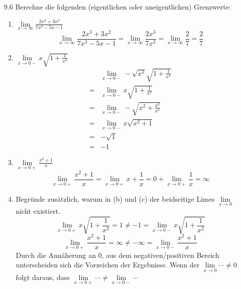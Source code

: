 \documentclass{HM}
\begin{document}
\begin{enumerate}
\item[9.6] Berechne die folgenden (eigentlichen oder uneigentlichen) Grenzwerte:
\begin{enumerate}
	\item $\lim\limits_{x\to\infty} \frac{2x^3+3x^2}{7x^3-5x-1}$
	$$\lim\limits_{x\to\infty} \frac{2x^3+3x^2}{7x^3-5x-1}=\lim\limits_{x\to\infty} \frac{2x^3}{7x^3}=\lim\limits_{x\to\infty} \frac{2}{7}=\frac{2}{7}$$
	\item $\lim\limits_{x\to0-} x\sqrt{1+\frac{1}{x^2}}$
	\begin{align*}
		&\lim\limits_{x\to0-} -\sqrt{x^2}\sqrt{1+\frac{1}{x^2}}\\
		=&\lim\limits_{x\to0-} x\sqrt{1+\frac{1}{x^2}}\\
		=&\lim\limits_{x\to0-} -\sqrt{x^2+\frac{x^2}{x^2}}\\
		=&\lim\limits_{x\to0-} x\sqrt{x^2+1}\\
		=& -\sqrt{1}\\
		=& -1
	\end{align*}
	\item $\lim\limits_{x\to0+}\frac{x^2+1}{x}$
	$$\lim\limits_{x\to0+}\frac{x^2+1}{x}
	=\lim\limits_{x\to0+}x+\frac{1}{x}
	=0+\lim\limits_{x\to0+}\frac{1}{x}
	=\infty$$
	
	\item Begründe zusätzlich, warum in (b) und (c) der beidseitige Limes $\lim\limits_{x\to0}$ nicht existiert.
	$$\lim\limits_{x\to0+}x\sqrt{1+\frac{1}{x^2}} = 1\not= -1 = \lim\limits_{x\to0-}x\sqrt{1+\frac{1}{x^2}}$$
	$$\lim\limits_{x\to0+}\frac{x^2+1}{x} = \infty\not= -\infty = \lim\limits_{x\to0-}\frac{x^2+1}{x}$$
	Durch die Annäherung an 0, aus dem negativen/positiven Bereich unterscheiden sich die Vorzeichen der Ergebnisse. Wenn der $\lim\limits_{x\to0}\cdots\not=0$ folgt daraus, dass $\lim\limits_{x\to0+}\cdots\not=\lim\limits_{x\to0-}\cdots$
\end{enumerate}
\end{enumerate}
\end{document}
